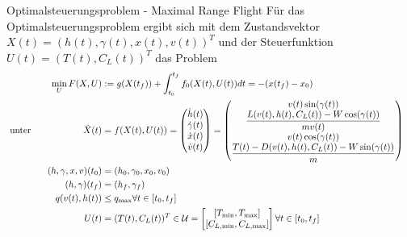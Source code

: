 \documentclass[aspectratio=169]{beamer}
\begin{document}
\begin{frame}
  \begin{center}
  \begin{block}{Optimalsteuerungsproblem - Maximal Range Flight}
    \scriptsize   
    Für das Optimalsteuerungsproblem ergibt sich mit dem Zustandsvektor
    $X(t) = (h(t),\gamma(t),x(t),v(t))^T$
    und der Steuerfunktion
    $U(t) = (T(t),C_L(t))^T$
    das Problem
    \begin{align*}
        \min_{U} F(X,U) &:= g(X(t_f)) + \int_{t_0}^{t_f} f_0(X(t),U(t)) dt = -(x(t_f) - x_0) & & \\\
        \text{unter} \hspace{20mm} \dot{X}(t) &= f(X(t),U(t)) =     
         \begin{pmatrix}
         \dot{h}(t)  \\ 
         \dot{\gamma}(t)  \\ 
         \dot{x}(t)  \\ 
         \dot{v}(t)   \\ 
	 \end{pmatrix} 
        = 
        \begin{pmatrix}
            v(t) \sin(\gamma(t)) \\ 
            \dfrac{L(v(t),h(t),C_L(t)) - W \cos(\gamma(t))}{mv(t)} \\ 
            v(t) \cos(\gamma(t)) \\ 
            \dfrac{T(t) - D(v(t),h(t),C_L(t)) - W \sin(\gamma(t))}{m}
        \end{pmatrix} & & \\\
        (h,\gamma,x,v)(t_0) &= (h_0,\gamma_0,x_0,v_0) & & \\\
        (h,\gamma)(t_f) &= (h_f,\gamma_f) & & \\\
        q(v(t),h(t)) &\leq q_{\max}  \forall t \in [t_0,t_f]\\\
        U(t) &= (T(t),C_L(t))^T \in \mathcal{U} = \left[ 
        \begin{matrix}
            [T_{\min},T_{\max}] \\ 
            [C_{L, \min},C_{L, \max}]
        \end{matrix} 
        \right]  \forall t \in [t_0,t_f]
    \end{align*}
  \end{block}
  \end{center}
\end{frame}
\end{document}
